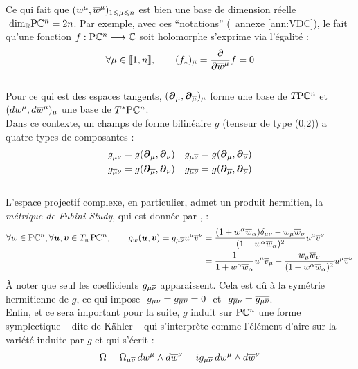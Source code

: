 Ce qui fait que $(w^\mu, \congu{w}^\mu)_{1\leq \mu \leq n}$ est bien une base de dimension réelle $\ \dim[\R]\PC{n} = 2n$. Par exemple, avec ces ``notations'' (\cf~annexe \ref{ann:VDC}), le fait qu'une fonction $f: \PC{n}\lr \C$ soit holomorphe s'exprime via l'égalité :
\[\forall \mu\in\llbracket1,n\rrbracket,\qquad (f_*)_{\congu{\mu}} = \frac{\partial}{\partial \congu{w}^\mu}f = 0\] 
\\
Pour ce qui est des espaces tangents, $(\bt_\mu, \bt_{\congu{\mu}})_\mu$ forme une base de $\tg{\PC{n}}$ et $(dw^\mu, d\congu{w}^\mu)_\mu$ une base de $\tg{^* \PC{n}}$.
\\
Dans ce contexte, un champs de forme bilinéaire $g$ (tenseur de type (0,2)) a quatre types de composantes :
\begin{align*}
	g_{\mu \nu} &= g(\bt_{\mu}, \bt_{\nu})  &  g_{\mu \congu{\nu}} &= g(\bt_{\mu}, \bt_{\congu{\nu}}) \\
	g_{\congu{\mu} \nu} &= g(\bt_{\congu{\mu}}, \bt_{\nu})  &  g_{\congu{\mu} \congu{\nu}} &= g(\bt_{\congu{\mu}}, \bt_{\congu{\nu}})
\end{align*}
\\
L'espace projectif complexe, en particulier, admet un produit hermitien, la \emph{métrique de Fubini-Study}, qui est donnée par \cite[sec. 8.5]{nakahara_geometry_2003}, \cite[chap. 4]{ballmann_lectures_2006} :
\begin{equation}
	\begin{aligned}
		\forall w\in\PC{n}, \forall \bf{u},\bf{v}\in\tg[w]{\PC{n}},\qquad g_w(\bf{u}, \bf{v}) = g_{\mu\congu{\nu}} u^\mu \congu{v}^\nu 
		&= \frac{(1+w^\alpha \congu{w}_\alpha)\delta_{\mu\nu} - w_\mu \congu{w}_\nu}{(1+w^\alpha \congu{w}_\alpha)^2}u^\mu \congu{v}^\nu \\
		&= \frac{1}{1+w^\alpha \congu{w}_\alpha} u^\mu \congu{v}_\mu - \frac{w_\mu \congu{w}_\nu}{(1+w^\alpha \congu{w}_\alpha)^2} u^\mu \congu{v}^\nu
	\end{aligned}
\end{equation}
À noter que seul les coefficients $g_{\mu \congu{\nu}}$ apparaissent. Cela est dû à la symétrie hermitienne de $g$, ce qui impose $\ g_{\mu\nu} = g_{\congu{\mu\nu}} = 0\ $ et $\ g_{\congu{\mu} \nu} = \congu{g_{\mu \congu{\nu}}}$.
\\
Enfin, et ce sera important pour la suite, $g$ induit sur $\PC{n}$ une forme symplectique -- dite de Kähler -- qui s'interprète comme l'élément d'aire sur la variété induite par $g$ et qui s'écrit :
\[\Omega = \Omega_{\mu\congu{\nu}}\, dw^\mu \wedge d\congu{w}^\nu 
	= ig_{\mu \congu{\nu}}\, dw^\mu \wedge d\congu{w}^\nu\]
\skipl





